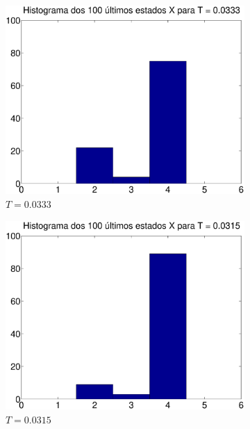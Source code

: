 \documentclass{report}
\begin{document}
\begin{figure}
\begin{subfigure}{0.32\textwidth}
		\includegraphics[width = \textwidth]{Q2_e_histograma_x_t_7}
		\caption{$T = 0.0333$}
	\end{subfigure}
		\begin{subfigure}{0.32\textwidth}
		\centering
		\includegraphics[width = \textwidth]{Q2_e_histograma_x_t_8}
		\caption{$T = 0.0315$}
	\end{subfigure}
		\begin{subfigure}{0.32\textwidth}
		\centering

\end{subfigure}
\end{figure}
\end{document}
